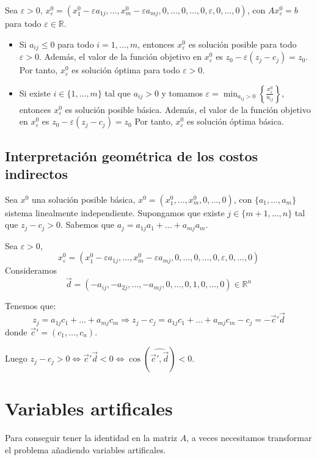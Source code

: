 Sea $\varepsilon > 0$, $x^0_\varepsilon = (x^0_1 - \varepsilon a_{1j}, \dots, x^0_m - \varepsilon a_{mj}, 0, \dots, 0, \dots, 0, \varepsilon, 0, \dots, 0)$, con $Ax^0_\varepsilon = b$ para todo $\varepsilon \in \mathbb{R}$.
\begin{itemize}
    \item Si $a_{ij} \leq 0$ para todo $i = 1, \dots, m$, entonces $x^0_\varepsilon$ es solución posible para todo $\varepsilon > 0$.
          Además, el valor de la función objetivo en $x^0_\varepsilon$ es $z_0 - \varepsilon(z_j-c_j) = z_0$.
          Por tanto, $x^0_\varepsilon$ es solución óptima para todo $\varepsilon > 0$.
    \item Si existe $i \in \{1, \dots, m\}$ tal que $a_{ij} > 0$ y tomamos $\varepsilon = \min_{a_{ij} > 0} \left\{\frac{x^0_i}{a_{ij}}\right\}$, entonces $x^0_\varepsilon$ es solución posible básica.
          Además, el valor de la función objetivo en $x^0_\varepsilon$ es $z_0 - \varepsilon(z_j-c_j) = z_0$
          Por tanto, $x^0_\varepsilon$ es solución óptima básica.
\end{itemize}

\subsection*{Interpretación geométrica de los costos indirectos}
Sea $x^0$ una solución posible básica, $x^0 = (x^0_1, \dots, x^0_m, 0, \dots, 0)$, con $\{a_1, \dots, a_m\}$ sistema linealmente independiente.
Supongamos que existe $j \in \{m+1, \dots, n\}$ tal que $z_j-c_j > 0$.
Sabemos que $a_j = a_{1j}a_1 + \dots + a_{mj}a_m$.

Sea $\varepsilon > 0$,
$$x^0_\varepsilon = (x^0_1 - \varepsilon a_{1j}, \dots, x^0_m - \varepsilon a_{mj}, 0, \dots, 0, \dots, 0, \varepsilon, 0, \dots, 0)$$
Consideramos
$$\vec{d} = (-a_{ij}, -a_{2j}, \dots, -a_{mj}, 0, \dots, 0, 1, 0, \dots, 0) \in \mathbb{R}^n$$

Tenemos que:
$$z_j = a_{1j}c_1 + \dots + a_{mj}c_m \Rightarrow z_j-c_j = a_{1j}c_1 + \dots + a_{mj}c_m - c_j = -\vec{c}'\vec{d}$$
donde $\vec{c}' = (c_1, \dots, c_n)$.

Luego $z_j - c_j > 0 \Leftrightarrow \vec{c}'\vec{d} < 0 \Leftrightarrow \cos(\widehat{\vec{c}', \vec{d}}) < 0$.

\section{Variables artificales}
Para conseguir tener la identidad en la matriz $A$, a veces necesitamos transformar el problema añadiendo variables artificales.

